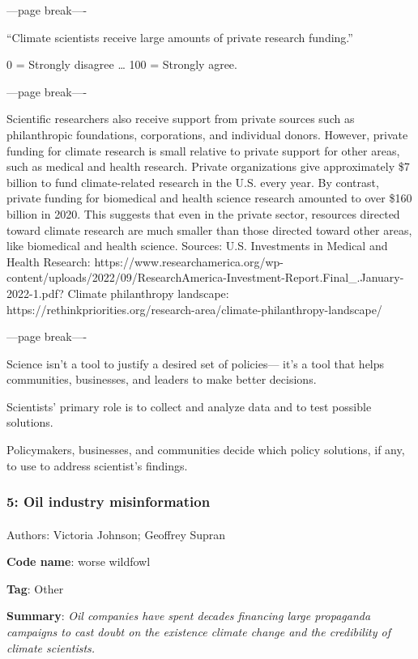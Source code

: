 \documentclass[
  letterpaper,
  DIV=11,
  numbers=noendperiod]{scrartcl}
\makeatletter
\let\oldparagraph\paragraph
\renewcommand{\paragraph}{
    \@ifstar
      \xxxParagraphStar
      \xxxParagraphNoStar
  }
\newcommand{\xxxParagraphStar}[1]{\oldparagraph*{#1}\mbox{}}
\newcommand{\xxxParagraphNoStar}[1]{\oldparagraph{#1}\mbox{}}
\makeatother
\begin{document}
---page break----

``Climate scientists receive large amounts of private research
funding.''

0 = Strongly disagree \ldots{} 100 = Strongly agree.

---page break----

Scientific researchers also receive support from private sources such as
philanthropic foundations, corporations, and individual donors. However,
private funding for climate research is small relative to private
support for other areas, such as medical and health research. Private
organizations give approximately \$7 billion to fund climate-related
research in the U.S. every year. By contrast, private funding for
biomedical and health science research amounted to over \$160 billion in
2020. This suggests that even in the private sector, resources directed
toward climate research are much smaller than those directed toward
other areas, like biomedical and health science. Sources: U.S.
Investments in Medical and Health Research:
https://www.researchamerica.org/wp-content/uploads/2022/09/ResearchAmerica-Investment-Report.Final\_.January-2022-1.pdf?
Climate philanthropy landscape:
https://rethinkpriorities.org/research-area/climate-philanthropy-landscape/

---page break----

Science isn't a tool to justify a desired set of policies--- it's a tool
that helps communities, businesses, and leaders to make better
decisions.

Scientists' primary role is to collect and analyze data and to test
possible solutions.

Policymakers, businesses, and communities decide which policy solutions,
if any, to use to address scientist's findings.

\subsubsection{5: Oil industry
misinformation}\label{oil-industry-misinformation}

\paragraph{Authors: Victoria Johnson; Geoffrey
Supran}\label{authors-victoria-johnson-geoffrey-supran}

\textbf{Code name}: worse wildfowl

\textbf{Tag}: Other

\textbf{Summary}: \emph{Oil companies have spent decades financing large
propaganda campaigns to cast doubt on the existence climate change and
the credibility of climate scientists.}
\end{document}
